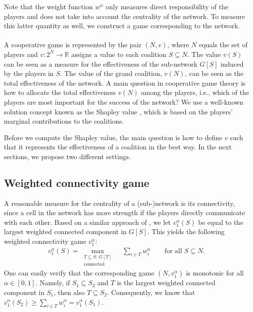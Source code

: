 \documentclass[10p]{article}
\theoremstyle{definition}
\theoremstyle{definition}
\begin{document}
Note that the weight function $w^\alpha$ only measures direct responsibility of the players and does not take into account the centrality of the network. To measure this latter quantity as well, we construct a game corresponding to the network.\\ \\
A cooperative game is represented by the pair $(N,v)$, where $N$ equals the set of players and $v : 2^N \rightarrow \mathbb{R}$ assigns a value to each coalition $S \subseteq N$. The value $v(S)$ can be seen as a measure for the effectiveness of the sub-network $G[S]$ induced by the players in $S$. The value of the grand coalition, $v(N)$, can be seen as the total effectiveness of the network. A main question in cooperative game theory is how to allocate the total effectiveness $v(N)$ among the players, i.e., which of the players are most important for the success of the network? We use a well-known solution concept known as the Shapley value \cite{shapley1953value}, which is based on the players' marginal contributions to the coalitions.

Before we compute the Shapley value, the main question is how to define $v$ such that it represents the effectiveness of a coalition in the best way. In the next sections, we propose two different settings.

\subsection{Weighted connectivity game}
A reasonable measure for the centrality of a (sub-)network is its connectivity, since a cell in the network has more strength if the players directly communicate with each other. Based on a similar approach of \cite{husslage2015ranking}, we let $v_1^\alpha(S)$ be equal to the largest weighted connected component in $G[S]$. This yields the following weighted connectivity game $v^\alpha_1$:
\begin{align*}
    v_1^\alpha(S) = \max_{\substack{T \subseteq S : \, G[T] \\ \text{connected}}}\quad \sum_{i \in T}w^\alpha_i \qquad \text{for all $S \subseteq N$.} 
\end{align*}
One can easily verify that the corresponding game $(N, v_1^\alpha)$ is monotonic for all $\alpha \in [0,1]$. Namely, if $S_1 \subseteq S_2$ and $T$ is the largest weighted connected component in $S_1$, then also $T \subseteq S_2$. Consequently, we know that $v_1^\alpha(S_2) \geq \sum_{i \in T}w^\alpha_i = v_1^\alpha(S_1)$.
\end{document}
